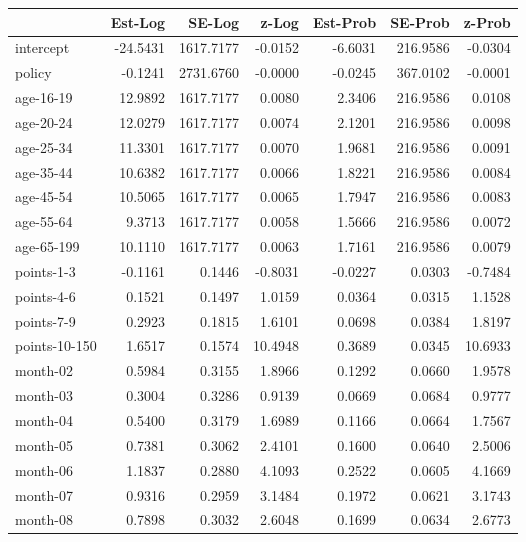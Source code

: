 \documentclass[10pt]{article}
\begin{document}
\begin{table}[ht]
\centering
\begin{tabular}{lrrrrrr}
  \hline
 & Est-Log & SE-Log & z-Log & Est-Prob & SE-Prob & z-Prob \\ 
  \hline
intercept & -24.5431 & 1617.7177 & -0.0152 & -6.6031 & 216.9586 & -0.0304 \\ 
  policy & -0.1241 & 2731.6760 & -0.0000 & -0.0245 & 367.0102 & -0.0001 \\ 
  age-16-19 & 12.9892 & 1617.7177 & 0.0080 & 2.3406 & 216.9586 & 0.0108 \\ 
  age-20-24 & 12.0279 & 1617.7177 & 0.0074 & 2.1201 & 216.9586 & 0.0098 \\ 
  age-25-34 & 11.3301 & 1617.7177 & 0.0070 & 1.9681 & 216.9586 & 0.0091 \\ 
  age-35-44 & 10.6382 & 1617.7177 & 0.0066 & 1.8221 & 216.9586 & 0.0084 \\ 
  age-45-54 & 10.5065 & 1617.7177 & 0.0065 & 1.7947 & 216.9586 & 0.0083 \\ 
  age-55-64 & 9.3713 & 1617.7177 & 0.0058 & 1.5666 & 216.9586 & 0.0072 \\ 
  age-65-199 & 10.1110 & 1617.7177 & 0.0063 & 1.7161 & 216.9586 & 0.0079 \\ 
  points-1-3 & -0.1161 & 0.1446 & -0.8031 & -0.0227 & 0.0303 & -0.7484 \\ 
  points-4-6 & 0.1521 & 0.1497 & 1.0159 & 0.0364 & 0.0315 & 1.1528 \\ 
  points-7-9 & 0.2923 & 0.1815 & 1.6101 & 0.0698 & 0.0384 & 1.8197 \\ 
  points-10-150 & 1.6517 & 0.1574 & 10.4948 & 0.3689 & 0.0345 & 10.6933 \\ 
  month-02 & 0.5984 & 0.3155 & 1.8966 & 0.1292 & 0.0660 & 1.9578 \\ 
  month-03 & 0.3004 & 0.3286 & 0.9139 & 0.0669 & 0.0684 & 0.9777 \\ 
  month-04 & 0.5400 & 0.3179 & 1.6989 & 0.1166 & 0.0664 & 1.7567 \\ 
  month-05 & 0.7381 & 0.3062 & 2.4101 & 0.1600 & 0.0640 & 2.5006 \\ 
  month-06 & 1.1837 & 0.2880 & 4.1093 & 0.2522 & 0.0605 & 4.1669 \\ 
  month-07 & 0.9316 & 0.2959 & 3.1484 & 0.1972 & 0.0621 & 3.1743 \\ 
  month-08 & 0.7898 & 0.3032 & 2.6048 & 0.1699 & 0.0634 & 2.6773 \\ 

\end{tabular}
\end{table}
\end{document}
